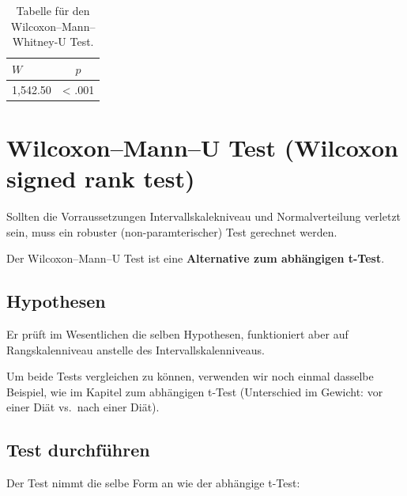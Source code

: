 \documentclass[
]{book}
\newenvironment{Shaded}{\begin{snugshade}}{\end{snugshade}}
\newcommand{\AttributeTok}[1]{\textcolor[rgb]{0.13,0.29,0.53}{#1}}
\newcommand{\FunctionTok}[1]{\textcolor[rgb]{0.13,0.29,0.53}{\textbf{#1}}}
\newcommand{\NormalTok}[1]{#1}
\newcommand{\SpecialCharTok}[1]{\textcolor[rgb]{0.81,0.36,0.00}{\textbf{#1}}}
\begin{document}
\begin{table}[tbp]

\begin{center}
\begin{threeparttable}

\caption{\label{tab:unnamed-chunk-272}Tabelle für den Wilcoxon–Mann–Whitney-U Test.}

\begin{tabular}{ll}
\toprule
$W$ & \multicolumn{1}{c}{$p$}\\
\midrule
1,542.50 & < .001\\
\bottomrule
\end{tabular}

\end{threeparttable}
\end{center}

\end{table}

\section{Wilcoxon--Mann--U Test (Wilcoxon signed rank test)}\label{wilcoxonmannu-test-wilcoxon-signed-rank-test}

Sollten die Vorraussetzungen Intervallskalekniveau und Normalverteilung verletzt sein, muss ein robuster (non-paramterischer) Test gerechnet werden.

Der Wilcoxon--Mann--U Test ist eine \textbf{Alternative zum abhängigen t-Test}.

\subsection{Hypothesen}\label{hypothesen-5}

Er prüft im Wesentlichen die selben Hypothesen, funktioniert aber auf Rangskalenniveau anstelle des Intervallskalenniveaus.

Um beide Tests vergleichen zu können, verwenden wir noch einmal dasselbe Beispiel, wie im Kapitel zum abhängigen t-Test (Unterschied im Gewicht: vor einer Diät vs.~nach einer Diät).

\subsection{Test durchführen}\label{test-durchfuxfchren-4}

Der Test nimmt die selbe Form an wie der abhängige t-Test:

\begin{Shaded}
\end{Shaded}
\end{document}
